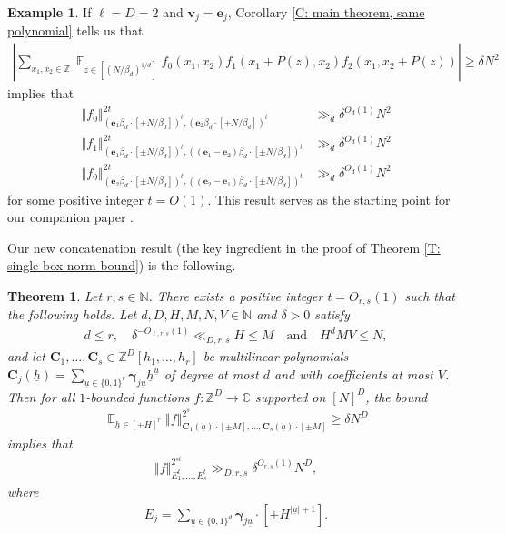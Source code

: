 \documentclass[11pt]{amsart}
\newtheorem{theorem}[lemma]{Theorem}
\theoremstyle{definition}
\newtheorem{example}[lemma]{Example} %
\DeclareMathOperator*{\E}{\mathbb{E}}
\newcommand{\C}{{\mathbb C}}
\newcommand{\N}{{\mathbb N}}
\newcommand{\Z}{{\mathbb Z}}
\newcommand{\bc}{{\textbf{C}}}
\newcommand{\be}{{\mathbf{e}}}
\newcommand{\bv}{{\textbf{v}}}
\newcommand{\bgamma}{{\boldsymbol{\gamma}}}
\newcommand{\uh}{{\underline{h}}}
\newcommand{\uu}{{\underline{u}}}
\newcommand{\norm}[1]{\left\Vert #1\right\Vert}
\newcommand{\abs}[1]{\mathopen{}\left| #1\mathclose{}\right|}
\begin{document}
\begin{example}
    If $\ell=D=2$ and $\bv_j = \be_j$, Corollary \ref{C: main theorem, same polynomial} tells us that
    \begin{align*}
        \abs{\sum_{x_1,x_2\in\Z}\E_{z\in[(N/\beta_d)^{1/d}]} f_0(x_1, x_2)f_1(x_1+P(z), x_2)f_2(x_1, x_2+P(z))}\geq \delta N^2
    \end{align*}
    implies that
    \begin{align*}
        \norm{f_0}_{(\be_1 \beta_d\cdot[\pm N/\beta_d])^t, (\be_2 \beta_d\cdot[\pm N/\beta_d])^t}^{2t}&\gg_{d}\delta^{O_{d}(1)}N^2\\
        \norm{f_1}_{(\be_1 \beta_d\cdot[\pm N/\beta_d])^t, ((\be_1-\be_2) \beta_d\cdot[\pm N/\beta_d])^t}^{2t}&\gg_{d}\delta^{O_{d}(1)}N^2\\
        \norm{f_0}_{(\be_2 \beta_d\cdot[\pm N/\beta_d])^t, ((\be_2-\be_1) \beta_d\cdot[\pm N/\beta_d])^t}^{2t}&\gg_{d}\delta^{O_{d}(1)}N^2
    \end{align*}
    for some positive integer $t=O(1)$.  This result serves as the starting point for our companion paper \cite{KKL24b}.
\end{example}





Our new concatenation result (the key ingredient in the proof of Theorem \ref{T: single box norm bound}) is the following.
\begin{theorem}\label{T: concatenation of polynomials}
Let $r,s \in \N$.  There exists a positive integer $t=O_{r, s}(1)$ such that the following holds.  Let $d, D, H, M, N, V\in\N$ and $\delta>0$ satisfy
    \begin{align*}
        d\leq r,\quad \delta^{-O_{\ell, r, s}(1)}\ll_{D, r, s} H\leq M\quad \textrm{and}\quad H^d M V\leq N,
    \end{align*}
    and let $\bc_1, \ldots, \bc_s\in\Z^D[h_1, \ldots, h_r]$ be multilinear polynomials $\bc_j(\uh) = \sum\limits_{\uu\in\{0,1\}^r} \bgamma_{j\uu}\uh^\uu$ of degree at most $d$ and with coefficients at most $V$.  Then for all $1$-bounded functions $f:\Z^D\to\C$ supported on $[N]^D$, the bound
    \begin{align*}
        \E_{\uh\in[\pm H]^r}\norm{f}_{\bc_1(\uh)\cdot[\pm M], \ldots, \bc_s(\uh)\cdot[\pm M]}^{2^s}\geq \delta N^D
    \end{align*}
        implies that
    \begin{align*}
        \norm{f}_{E_1^{ t}, \ldots, E_s^{ t}}^{2^{st}}\gg_{D, r, s}\delta^{O_{r, s}(1)}N^{D},
    \end{align*}
    where
    \begin{align*}
        E_j = \sum_{\uu\in\{0,1\}^d}\bgamma_{j\uu}\cdot [\pm H^{|\uu|+1}].
    \end{align*} 
\end{theorem}
\end{document}

